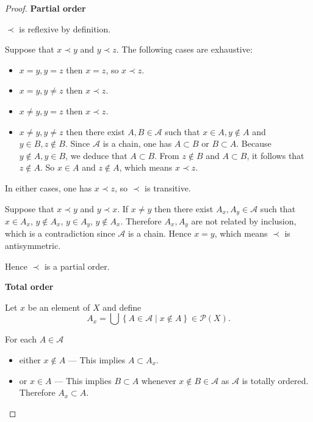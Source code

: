 \begin{proof}
	\textbf{Partial order}

	\( \prec \) is reflexive by definition.

	Suppose that \( x \prec y \) and \( y \prec z \). The following cases are exhaustive:
	\begin{itemize}[itemsep=0pt]
		\item \( x = y, y = z \) then \( x = z \), so \( x \prec z \).
		\item \( x = y, y \ne z \) then \( x \prec z \).
		\item \( x \ne y, y = z \) then \( x \prec z \).
		\item \( x \ne y, y \ne z \) then there exist \( A, B \in \mathscr{A} \) such that \( x \in A, y \notin A \) and \( y \in B, z \notin B \). Since \( \mathscr{A} \) is a chain, one has \( A \subset B \) or \( B \subset A \). Because \( y \notin A, y \in B \), we deduce that \( A \subset B \). From \( z \notin B \) and \( A \subset B \), it follows that \( z \notin A \). So \( x \in A \) and \( z \notin A \), which means \( x \prec z \).
	\end{itemize}

	In either cases, one has \( x \prec z \), so \( \prec \) is transitive.

	Suppose that \( x \prec y \) and \( y \prec x \). If \( x \ne y \) then there exist \( A_{x}, A_{y} \in \mathscr{A} \) such that \( x \in A_{x} \), \( y \notin A_{x} \), \( y \in A_{y} \), \( y \notin A_{x} \). Therefore \( A_{x}, A_{y} \) are not related by inclusion, which is a contradiction since \( \mathscr{A} \) is a chain. Hence \( x = y \), which means \( \prec \) is antisymmetric.

	Hence \( \prec \) is a partial order.

	\textbf{Total order}

	Let \( x \) be an element of \( X \) and define
	\[
		A_{x} = \bigcup \left\{ A \in \mathscr{A} \mid x \notin A \right\} \in \mathscr{P}(X).
	\]

	For each \( A \in \mathscr{A} \)
	\begin{itemize}[itemsep=0pt]
		\item either \( x \notin A \) --- This implies \( A \subset A_{x} \).
		\item or \( x \in A \) --- This implies \( B \subset A \) whenever \( x \notin B \in \mathscr{A} \) as \( \mathscr{A} \) is totally ordered. Therefore \( A_{x} \subset A \).
	\end{itemize}


\end{proof}
